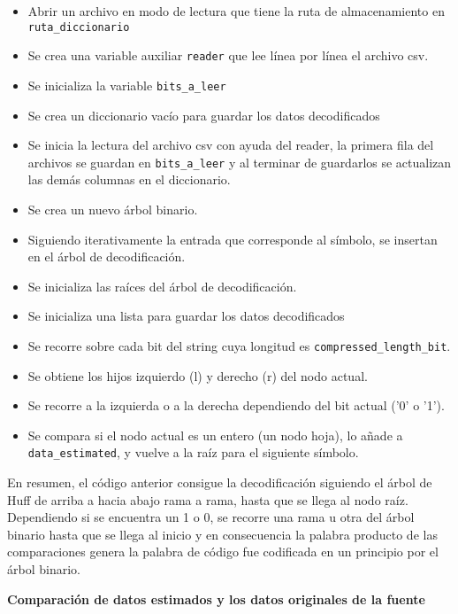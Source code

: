 \documentclass[conference,onecolumn,12pt]{IEEEtran}
\numberwithin{equation}{subsection}
\begin{document}
\begin{itemize}
\item Abrir un archivo en modo de lectura que tiene la ruta de almacenamiento en \texttt{ruta_diccionario}
\item Se crea una variable auxiliar \texttt{reader} que lee línea por línea el archivo csv.
\item Se inicializa la variable \texttt{bits_a_leer}
\item Se crea un diccionario vacío para guardar los datos decodificados
\item Se inicia la lectura del archivo csv con ayuda del reader, la primera fila del archivos se guardan en \texttt{bits_a_leer} y al terminar de guardarlos se actualizan las demás columnas en el diccionario.
\item Se crea un nuevo árbol binario.
\item Siguiendo iterativamente la entrada que corresponde al símbolo, se insertan en el árbol de decodificación.
\item Se inicializa las raíces del árbol de decodificación.
 \item Se inicializa una lista para guardar los datos decodificados
\item Se recorre sobre cada bit del string cuya longitud es \texttt{compressed_length_bit}.
\item Se obtiene los hijos izquierdo (l) y derecho (r) del nodo actual.
\item Se recorre a la izquierda o a la derecha dependiendo del bit actual ('0' o '1').
\item Se compara si el nodo actual es un entero (un nodo hoja), lo añade a \texttt{data_estimated}, y vuelve a la raíz para el siguiente símbolo.
\end{itemize}


En resumen, el código anterior consigue la decodificación siguiendo el árbol de Huff de arriba a hacia abajo rama a rama, hasta que se llega al nodo raíz. Dependiendo si se encuentra un 1 o 0, se recorre una rama u otra del árbol binario hasta que se llega al inicio y en consecuencia la palabra producto de las comparaciones genera la palabra de código fue codificada en un principio por el árbol binario.

\newpage

\textbf{Comparación de datos estimados y los datos originales de la fuente}
\end{document}
